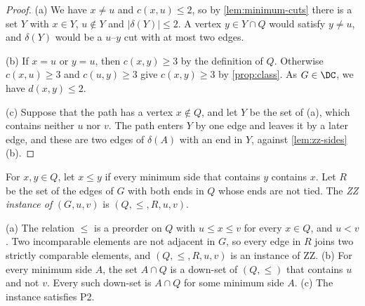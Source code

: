 \begin{proof}
(a) We have $x \neq u$ and $c(x, u) \leq 2$, so by \cref{lem:minimum-cuts} there is a set $Y$ with $x \in Y$, $u \notin Y$ and $|\delta(Y)| \leq 2$.
A vertex $y \in Y \cap Q$ would satisfy $y \neq u$, and $\delta(Y)$ would be a $u$--$y$ cut with at most two edges.

(b) If $x = u$ or $y = u$, then $c(x, y) \geq 3$ by the definition of $Q$.
Otherwise $c(x, u) \geq 3$ and $c(u, y) \geq 3$ give $c(x, y) \geq 3$ by \cref{prop:class}.
As $G \in \DC$, we have $d(x, y) \leq 2$.

(c) Suppose that the path has a vertex $x \notin Q$, and let $Y$ be the set of (a), which contains neither $u$ nor $v$.
The path enters $Y$ by one edge and leaves it by a later edge, and these are two edges of $\delta(A)$ with an end in $Y$, against \cref{lem:zz-sides}(b).
\end{proof}

\begin{definition}
\label{def:zz-instance}
For $x, y \in Q$, let $x \leq y$ if every minimum side that contains $y$ contains $x$.
Let $R$ be the set of the edges of $G$ with both ends in $Q$ whose ends are not tied.
The \emph{ZZ instance of} $(G, u, v)$ is $(Q, \leq, R, u, v)$.
\end{definition}

\begin{lemma}
\label{lem:zz-instance}
(a) The relation $\leq$ is a preorder on $Q$ with $u \leq x \leq v$ for every $x \in Q$, and $u < v$.
Two incomparable elements are not adjacent in $G$, so every edge in $R$ joins two strictly comparable elements, and $(Q, \leq, R, u, v)$ is an instance of ZZ.
(b) For every minimum side $A$, the set $A \cap Q$ is a down-set of $(Q, \leq)$ that contains $u$ and not $v$.
Every such down-set is $A \cap Q$ for some minimum side $A$.
(c) The instance satisfies P2.
\end{lemma}

